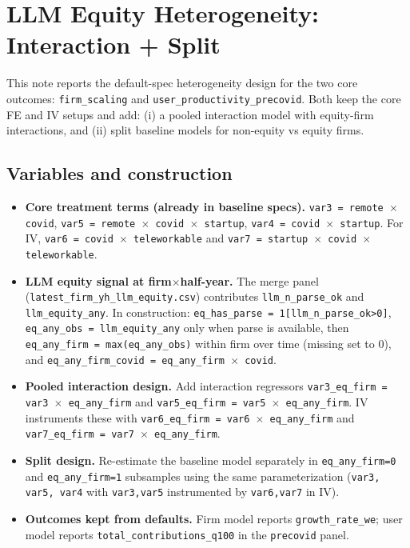 \documentclass{article}
\begin{document}
\section*{LLM Equity Heterogeneity: Interaction + Split}

This note reports the default-spec heterogeneity design for the two core outcomes:
\texttt{firm\_scaling} and \texttt{user\_productivity\_precovid}. Both keep the core FE and IV setups and add:
(i) a pooled interaction model with equity-firm interactions, and
(ii) split baseline models for non-equity vs equity firms.

\subsection*{Variables and construction}
\begin{itemize}
  \item \textbf{Core treatment terms (already in baseline specs).}
  \texttt{var3 = remote $\times$ covid}, \texttt{var5 = remote $\times$ covid $\times$ startup},
  \texttt{var4 = covid $\times$ startup}.
  For IV, \texttt{var6 = covid $\times$ teleworkable} and
  \texttt{var7 = startup $\times$ covid $\times$ teleworkable}.

  \item \textbf{LLM equity signal at firm$\times$half-year.}
  The merge panel (\texttt{latest\_firm\_yh\_llm\_equity.csv}) contributes
  \texttt{llm\_n\_parse\_ok} and \texttt{llm\_equity\_any}.
  In construction: \texttt{eq\_has\_parse = 1[llm\_n\_parse\_ok>0]},
  \texttt{eq\_any\_obs = llm\_equity\_any} only when parse is available,
  then \texttt{eq\_any\_firm = max(eq\_any\_obs)} within firm over time
  (missing set to 0), and \texttt{eq\_any\_firm\_covid = eq\_any\_firm $\times$ covid}.

  \item \textbf{Pooled interaction design.}
  Add interaction regressors
  \texttt{var3\_eq\_firm = var3 $\times$ eq\_any\_firm} and
  \texttt{var5\_eq\_firm = var5 $\times$ eq\_any\_firm}.
  IV instruments these with
  \texttt{var6\_eq\_firm = var6 $\times$ eq\_any\_firm} and
  \texttt{var7\_eq\_firm = var7 $\times$ eq\_any\_firm}.

  \item \textbf{Split design.}
  Re-estimate the baseline model separately in
  \texttt{eq\_any\_firm=0} and \texttt{eq\_any\_firm=1} subsamples using
  the same parameterization (\texttt{var3, var5, var4} with
  \texttt{var3,var5} instrumented by \texttt{var6,var7} in IV).

  \item \textbf{Outcomes kept from defaults.}
  Firm model reports \texttt{growth\_rate\_we}; user model reports
  \texttt{total\_contributions\_q100} in the \texttt{precovid} panel.
\end{itemize}
\end{document}
